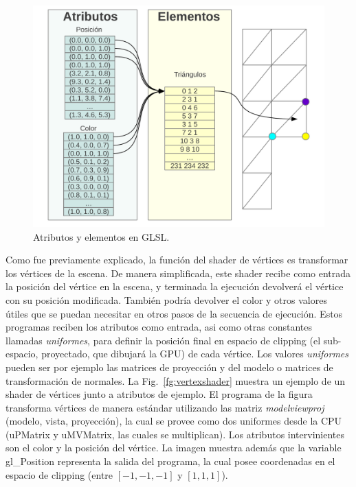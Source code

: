 \begin{figure}[h]
\begin{center}
\includegraphics[width=13cm]{figures/atributos}
\end{center}
\caption{Atributos y elementos en GLSL.}
\label{fg:atributos}
\end{figure}

Como fue previamente explicado, la funci\'on del shader de vértices es transformar los v\'ertices de la escena.
De manera simplificada, este shader recibe como entrada la posici\'on del v\'ertice en la escena, y terminada la ejecuci\'on devolver\'a el v\'ertice con su posici\'on modificada.
Tambi\'en podr\'ia devolver el color y otros valores \'utiles que se puedan necesitar en otros pasos de la secuencia de ejecución.
Estos programas reciben los atributos como entrada, asi como otras constantes llamadas \emph{uniformes}, para definir la posición final en espacio de clipping (el sub-espacio, proyectado, que dibujará la GPU) de cada vértice.
Los valores \emph{uniformes} pueden ser por ejemplo las matrices de proyección y del modelo o matrices de transformación de normales.
La Fig.~\ref{fg:vertexshader} muestra un ejemplo de un shader de vértices junto a atributos de ejemplo.
El programa de la figura transforma vértices de manera estándar utilizando las matriz {\em modelviewproj} (modelo, vista, proyección), la cual se provee como dos uniformes desde la CPU (uPMatrix y uMVMatrix, las cuales se multiplican).
Los atributos intervinientes son el color y la posición del vértice.
La imagen muestra además que la variable gl\_Position representa la salida del programa, la cual posee coordenadas en el espacio de clipping (entre $[-1,-1,-1]$ y $[1,1,1]$).

